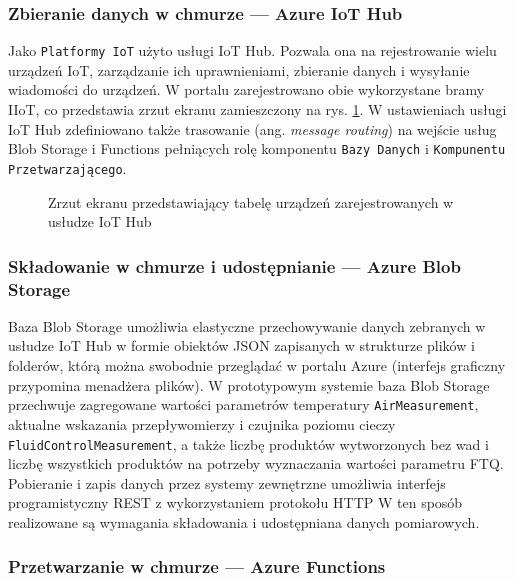 \documentclass[a4paper, 12pt, twoside]{article}
\begin{document}
\subsubsection{Zbieranie danych w chmurze --- Azure IoT Hub}
Jako \texttt{Platformy IoT} użyto usługi IoT Hub. Pozwala ona na rejestrowanie
wielu urządzeń IoT, zarządzanie ich uprawnieniami, zbieranie danych i wysyłanie
wiadomości do urządzeń. W portalu zarejestrowano obie wykorzystane bramy IIoT, co przedstawia
zrzut ekranu zamieszczony na rys. \ref{fig:iot_hub_1}. W ustawieniach
usługi IoT Hub zdefiniowano także trasowanie (ang. \emph{message routing})
na wejście usług Blob Storage i Functions pełniących rolę komponentu
\texttt{Bazy Danych} i \texttt{Kompunentu Przetwarzającego}.

\begin{figure}[h]
      \centering
      \caption{Zrzut ekranu przedstawiający tabelę urządzeń zarejestrowanych w usłudze IoT Hub}
      \label{fig:iot_hub_1}
\end{figure}

\subsubsection{Składowanie w chmurze i udostępnianie --- Azure Blob Storage}
Baza Blob Storage umożliwia elastyczne przechowywanie danych zebranych w
usłudze IoT Hub w formie obiektów JSON zapisanych w strukturze plików i folderów,
którą można swobodnie przeglądać w portalu Azure (interfejs graficzny przypomina
menadżera plików).
W prototypowym systemie baza Blob Storage przechwuje zagregowane wartości
parametrów temperatury \texttt{AirMeasurement}, aktualne wskazania przepływomierzy
i czujnika poziomu cieczy \texttt{FluidControlMeasurement}, a także liczbę
produktów wytworzonych bez wad i liczbę wszystkich produktów na potrzeby
wyznaczania wartości parametru FTQ. Pobieranie i zapis danych przez systemy
zewnętrzne umożliwia interfejs programistyczny
REST z wykorzystaniem protokołu HTTP \cite{blob-storage-doc}
W ten sposób realizowane są wymagania składowania i udostępniana danych pomiarowych.

\subsubsection{Przetwarzanie w chmurze --- Azure Functions}
\end{document}
